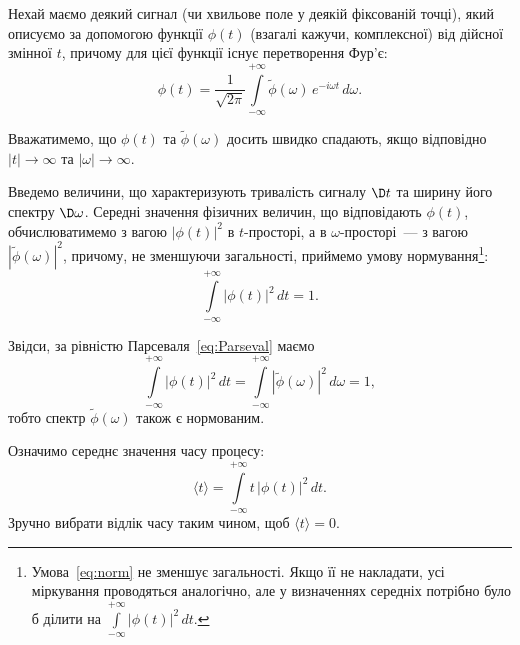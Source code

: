 Нехай маємо деякий сигнал (чи хвильове поле у деякій фіксованій точці), який описуємо за допомогою функції $\phi(t)$
(взагалі кажучи, комплексної) від дійсної змінної $t$, причому для цієї функції існує перетворення Фур'є:
\begin{equation}\label{eq:Fourier}
	{\phi}(t) = \frac1{\sqrt{2\pi}} \int\limits_{-\infty}^{+\infty} \tilde\phi(\omega)\, e^{-i\omega t}\, d\omega.
\end{equation}

Вважатимемо, що $\phi(t)$ та $\tilde{\phi}(\omega)$ досить швидко спадають, якщо відповідно $|t| \to \infty$ та
$|\omega| \to \infty$.

Введемо величини, що характеризують тривалість сигналу $\D t$ та ширину його спектру $\D\omega$. Середні
значення фізичних величин, що відповідають $\phi(t)$, обчислюватимемо з вагою $|\phi(t)|^2$ в $t$-просторі, а в
$\omega$-просторі~--- з вагою $|\tilde{\phi}(\omega)|^2$, причому, не зменшуючи загальності, приймемо умову
нормування\footnote{%
	Умова~\eqref{eq:norm} не зменшує загальності. Якщо її не накладати, усі міркування проводяться аналогічно, але у
	визначеннях середніх потрібно було б ділити на $\displaystyle\int\limits_{-\infty}^{+\infty}|\phi(t)|^2\,dt$. }:
\begin{equation}\label{eq:norm}
	\int\limits_{-\infty}^{+\infty} |\phi(t)|^2\, dt = 1.
\end{equation}

Звідси, за рівністю Парсеваля~\eqref{eq:Parseval} маємо
\begin{equation*}
	\int\limits_{-\infty}^{+\infty} |{\phi}(t)|^2\, dt =  \int\limits_{-\infty}^{+\infty} |\tilde{\phi}(\omega)|^2\, d\omega = 1,
\end{equation*}
тобто спектр $\tilde{\phi}(\omega)$ також є нормованим.

Означимо середнє значення часу процесу:
\begin{equation*}
	\langle t \rangle = \int\limits_{-\infty}^{+\infty} t\, |\phi(t)|^2\, dt.
\end{equation*}
Зручно вибрати відлік часу таким чином, щоб $\langle t \rangle = 0$.

